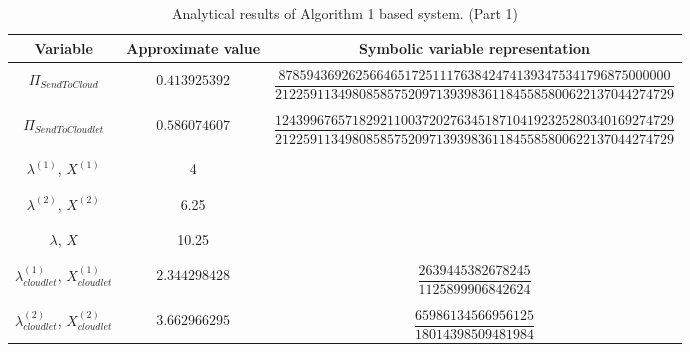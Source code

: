 \documentclass[10pt,a4paper]{article}
\begin{document}
\newpage

\begin{table}[h!]
\caption{Analytical results of Algorithm 1 based system. (Part 1)}
\begin{adjustbox}{center=\textwidth}
	
     \begin{tabular}{c|c|c}
     \toprule
     \textbf{Variable} & \textbf{Approximate value} & \textbf{Symbolic variable representation} \\
     \toprule
	 &&\\
	 $\Pi_{SendToCloud}$ & $0.413925392$ & $\dfrac{87859436926256646517251117638424741393475341796875000000}{212259113498085857520971393983611845585800622137044274729}$  \\
	 
	 &&\\\hline &&\\
	 
	 $\Pi_{SendToCloudlet}$ & $0.586074607$ &  $\dfrac{124399676571829211003720276345187104192325280340169274729}{212259113498085857520971393983611845585800622137044274729}$  \\
	 
     &&\\\hline &&\\

	 $\lambda^{(1)}$, $X^{(1)}$ & 4 & \\
	 
	 &&\\\hline &&\\

	 $\lambda^{(2)}$, $X^{(2)}$ & 6.25 & \\
	 
	 &&\\\hline &&\\

	 $\lambda$, $X$ & 10.25 & \\
	 
	 &&\\\hline &&\\

     $\lambda_{cloudlet}^{(1)}$, $X_{cloudlet}^{(1)}$ & $2.344298428$ & $\dfrac{2639445382678245}{1125899906842624}$ \\

	 &&\\\hline &&\\

     $\lambda_{cloudlet}^{(2)}$, $X_{cloudlet}^{(2)}$ & $3.662966295$ & $\dfrac{65986134566956125}{18014398509481984}$ \\


\end{tabular}
\end{adjustbox}
\end{table}
\end{document}
